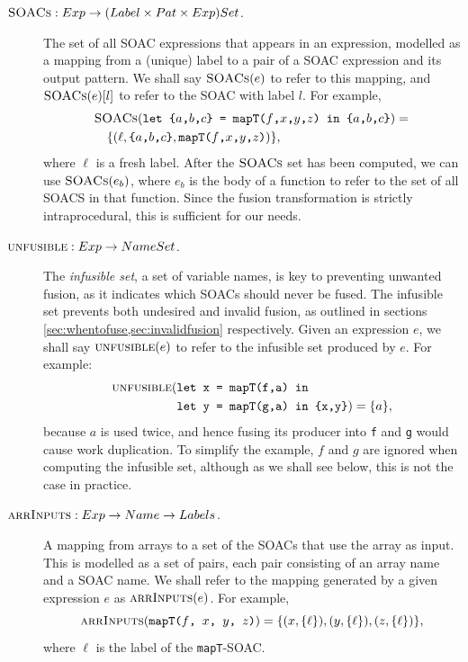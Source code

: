 \begin{description}
\item[$\textsc{SOACs} : Exp \rightarrow (Label \times Pat \times Exp) Set$.]
  The set of all SOAC expressions that appears in an expression,
  modelled as a mapping from a (unique) label to a pair of a SOAC
  expression and its output pattern.  We shall say $\textsc{SOACs}(e)$ to
  refer to this mapping, and $\textsc{SOACs}(e)[l]$ to refer to the SOAC with
  label $l$.  For example,
  \begin{align*}
  & \textsc{SOACs}(\texttt{let \{$a$,$b$,$c$\} = mapT($f$,$x$,$y$,$z$) in \{$a$,$b$,$c$\}}) =\\
  & \quad \{ (\ell, \texttt{\{$a$,$b$,$c$\}},\texttt{mapT($f$,$x$,$y$,$z$)}) \},
  \end{align*}
  where $\ell$ is a fresh label.  After the $\textsc{SOACs}$ set has been
  computed, we can use $\textsc{SOACs}(e_{b})$, where $e_{b}$ is the body of a
  function to refer to the set of all SOACS in that function.  Since
  the fusion transformation is strictly intraprocedural, this is
  sufficient for our needs.

\item[$\textsc{unfusible} : Exp \rightarrow Name Set$.] The \textit{infusible
    set}, a set of variable names, is key to preventing unwanted
  fusion, as it indicates which SOACs should never be fused.  The
  infusible set prevents both undesired and invalid fusion, as
  outlined in sections \cref{sec:whentofuse,sec:invalidfusion}
  respectively.  Given an \LO{} expression $e$, we shall say
  $\textsc{unfusible}(e)$ to refer to the infusible set produced by $e$.  For
  example:
  \begin{align*}
  \textsc{unfusible}(&\texttt{let x = mapT(f,a) in}\\
  &\texttt{let y = mapT(g,a) in \{x,y\}}) = \{a\},
  \end{align*}
  because $a$ is used twice, and hence fusing its producer into
  \texttt{f} and \texttt{g} would cause work duplication.  To simplify
  the example, $f$ and $g$ are ignored when computing the infusible
  set, although as we shall see below, this is not the case in
  practice.

\item[$\textsc{arrInputs} : Exp \rightarrow Name \rightarrow Labels$.] A mapping from arrays to a set of the SOACs that use the array
  as input.  This is modelled as a set of pairs, each pair consisting
  of an array name and a SOAC name.  We shall refer to the mapping
  generated by a given expression $e$ as $\textsc{arrInputs}(e)$.  For example,
  \[
  \textsc{arrInputs}(\texttt{mapT($f$, $x$, $y$, $z$)}) = \{ (x, \{\ell\}), (y, \{\ell\}), (z, \{\ell\}) \},
  \]
  where $\ell$ is the label of the \texttt{mapT}-SOAC.


\end{description}
